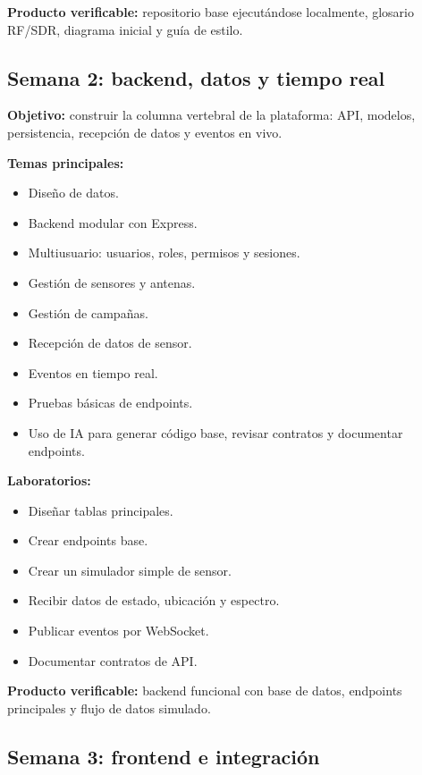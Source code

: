 \documentclass[11pt,a4paper]{article}
\newcommand{\producto}{\textbf{Producto verificable:} }
\begin{document}
\producto repositorio base ejecutándose localmente, glosario RF/SDR, diagrama inicial y guía de estilo.

\subsection*{Semana 2: backend, datos y tiempo real}

\textbf{Objetivo:} construir la columna vertebral de la plataforma: API, modelos, persistencia, recepción de datos y eventos en vivo.

\textbf{Temas principales:}

\begin{itemize}
  \item Diseño de datos.
  \item Backend modular con Express.
  \item Multiusuario: usuarios, roles, permisos y sesiones.
  \item Gestión de sensores y antenas.
  \item Gestión de campañas.
  \item Recepción de datos de sensor.
  \item Eventos en tiempo real.
  \item Pruebas básicas de endpoints.
  \item Uso de IA para generar código base, revisar contratos y documentar endpoints.
\end{itemize}

\textbf{Laboratorios:}

\begin{itemize}
  \item Diseñar tablas principales.
  \item Crear endpoints base.
  \item Crear un simulador simple de sensor.
  \item Recibir datos de estado, ubicación y espectro.
  \item Publicar eventos por WebSocket.
  \item Documentar contratos de API.
\end{itemize}

\producto backend funcional con base de datos, endpoints principales y flujo de datos simulado.

\subsection*{Semana 3: frontend e integración}
\end{document}
